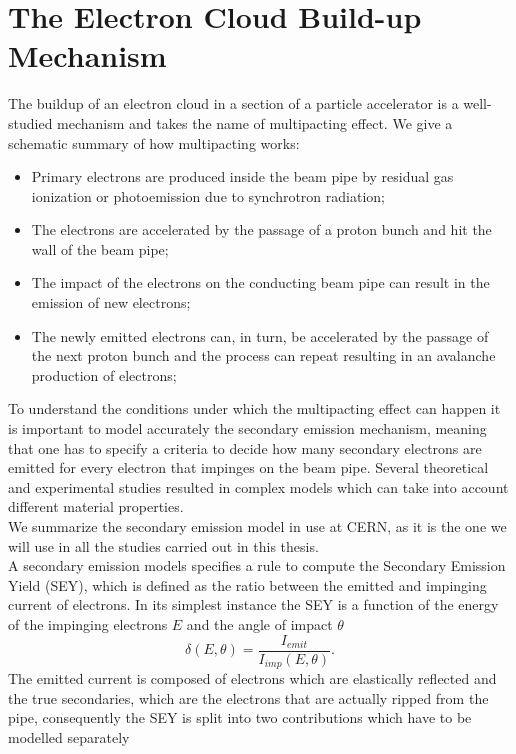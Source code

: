 \section{The Electron Cloud Build-up Mechanism}
\label{sec:SEY}
The buildup of an electron cloud in a section of a particle accelerator is a well-studied mechanism and takes the name of multipacting effect. We give a schematic summary of how multipacting works:
\begin{BoxedText*}
\begin{itemize}
    \item Primary electrons are produced inside the beam pipe by residual gas ionization or photoemission due to synchrotron radiation;
    \item The electrons are accelerated by the passage of a proton bunch and hit the wall of the beam pipe;
    \item The impact of the electrons on the conducting beam pipe can result in the emission of new electrons;
    \item The newly emitted electrons can, in turn, be accelerated by the passage of the next proton bunch and the process can repeat resulting in an avalanche production of electrons;
\end{itemize}
\end{BoxedText*}
To understand the conditions under which the multipacting effect can happen it is important to model accurately the secondary emission mechanism, meaning that one has to specify a criteria to decide how many secondary electrons are emitted for every electron that impinges on the beam pipe. Several theoretical and experimental studies resulted in complex models which can take into account different material properties.\\
We summarize the secondary emission model in use at CERN, as it is the one we will use in all the studies carried out in this thesis.\\
A secondary emission models specifies a rule to compute the Secondary Emission Yield (SEY), which is defined as the ratio between the emitted and impinging current of electrons. In its simplest instance the SEY is a function of the energy of the impinging electrons $E$ and the angle of impact $\theta$
$$\delta(E, \theta) = \frac{I_{emit}}{I_{imp}(E, \theta)}.$$
The emitted current is composed of electrons which are elastically reflected and the true secondaries, which are the electrons that are actually ripped from the pipe, consequently the SEY is split into two contributions which have to be modelled separately
